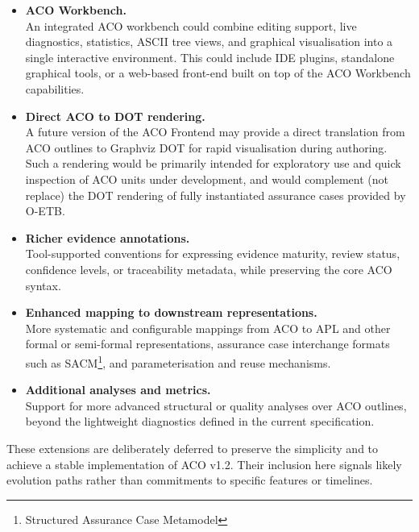 \documentclass[11pt,twoside,a4paper]{article}
\begin{document}
\begin{itemize}[leftmargin=2em]
  \item \textbf{ACO Workbench.} \\
        An integrated ACO workbench could combine editing support, live
        diagnostics, statistics, ASCII tree views, and graphical visualisation into a
        single interactive environment. This could include IDE plugins,
        standalone graphical tools, or a web-based front-end built on top of the
        ACO Workbench capabilities.

  \item \textbf{Direct ACO to DOT rendering.} \\
        A future version of the ACO Frontend may provide a direct translation
        from ACO outlines to Graphviz DOT for rapid visualisation during
        authoring. Such a rendering would be primarily intended for exploratory
        use and quick inspection of ACO units under development, and would complement (not replace) the DOT
        rendering of fully instantiated assurance cases provided by O-ETB.

  \item \textbf{Richer evidence annotations.} \\
        Tool-supported conventions for expressing evidence maturity, review
        status, confidence levels, or traceability metadata, while preserving
        the core ACO syntax.

  \item \textbf{Enhanced mapping to downstream representations.} \\
        More systematic and configurable mappings from ACO to APL and other
        formal or semi-formal representations, assurance case interchange formats such as SACM\footnote{Structured Assurance Case Metamodel}, and parameterisation and
        reuse mechanisms.

  \item \textbf{Additional analyses and metrics.} \\
        Support for more advanced structural or quality analyses over ACO
        outlines, beyond the lightweight diagnostics defined in the current
        specification.
\end{itemize}

These extensions are deliberately deferred to preserve the simplicity and to achieve a stable implementation
of ACO v1.2. Their inclusion here signals likely evolution paths
rather than commitments to specific features or timelines.
\end{document}
